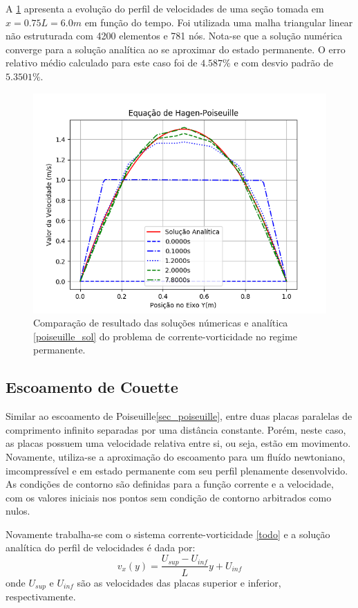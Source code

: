 A \ref{poiseuille_comp} apresenta a evolução do perfil de velocidades de uma seção tomada em $x=0.75L=6.0m$ em função do tempo.
Foi utilizada uma malha triangular linear não estruturada com 4200 elementos e 781 nós.
Nota-se que a solução numérica converge para a solução analítica ao se aproximar do estado permanente.
O erro relativo médio calculado para este caso foi de $4.587\%$ e com desvio padrão de $5.3501\%$.
\begin{figure}[H]
    \centering
    \includegraphics[width=.7\linewidth]{figures/Poiseuille_validation.png}
    \caption{Comparação de resultado das soluções númericas e analítica \ref{poiseuille_sol} do problema de corrente-vorticidade no regime permanente.}
    \label{poiseuille_comp}
\end{figure}

\subsection{\textbf{Escoamento de Couette}}
\label{sec_couette}
Similar ao escoamento de Poiseuille\ref{sec_poiseuille}, entre duas placas paralelas de comprimento infinito separadas por uma distância constante.
Porém, neste caso, as placas possuem uma velocidade relativa entre si, ou seja, estão em movimento.
Novamente, utiliza-se a aproximação do escoamento para um fluído newtoniano, imcompressível e em estado permanente com seu perfil plenamente desenvolvido.
As condições de contorno são definidas para a função corrente e a velocidade, com os valores iniciais nos pontos sem condição de contorno arbitrados como nulos.

Novamente trabalha-se com o sistema corrente-vorticidade \ref{todo} e a solução analítica do perfil de velocidades é dada por\cite{pontes_norberto}:
\begin{equation}
    v_x(y) = \dfrac{U_{sup} - U_{inf}}{L}y + U_{inf}
    \label{couette_sol} 
\end{equation}
onde $U_{sup}$ e $U_{inf}$ são as velocidades das placas superior e inferior, respectivamente.

